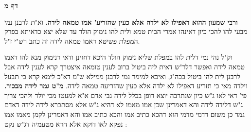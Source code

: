 \documentclass[12pt, openany]{book}
\newcommand{\sethebfont}{
\fontsize{10.5pt}{21.0pt} \selectfont
}
\newcommand{\twocol}[1]{
	{\sethebfont \begin{multicols}{2}
			#1
	\end{multicols}}	
}
\newcommand{\sectname}{}
\newcommand{\newsection}[1]{
	\addcontentsline{toc}{section}{#1}
	\renewcommand{\sectname}{#1}	
	\vspace{-\baselineskip}
	\begin{center}
		\textbf{%
\fontsize{16pt}{16pt}\selectfont
			#1}
	\end{center}
	\vspace{-\baselineskip}
	\nopagebreak
}
\begin{document}
\newsection{דף מ}
\twocol{
\textbf{ורבי שמעון ההוא דאפילו לא ילדה אלא כעין שהזריע' אמו טמאה לידה.}  וא"ת לרבנן נמי מבעי להו להכי כיון דאינהו אמרי הבית טמא ולית להו נימוק הולד עד שלא יצא כדאיתא בפרק המפלת פשיטא דאמו טמאה לידה זה כתב רש"י ז"ל.\par  וק"ל נהי נמי דלית להו במפלת שליא נימוק הולד היכא דחזינן ודאי דנימוק מנא להו דאמו טמאה לידה ואפשר דלר"ש דאית ליה ביטול ברוב לענין טומאה איצטרך קרא לענין לידה אבל לרבנן לית להו ביטול בכה"ג, ואיכא למימר נמי לרבנן ממילא ש"מ דא"כ לימא קרא כי תבעל וילדה מאי כי תזריע דאפילו לא ילדה אלא כעין שהזריעה טמאה לידה. 
\textbf{מ"ט גמר לידה מבכור.}  פי' דאי לאו ג"ש כיון שנתרבה יוצא דופן בכלל לידה גבי אדם א"א למעטו מכי יולד ולהכי צריך ג"ש דלידה לידה והא דאמרינן שכן אמו מאמו לא דהיא ג"ש אלא מסתברא לידה לידה דאדם גמר כן משום דדמי מדמי הוא דהכא כתיב אמו והכא כתיב אמו והא דאמרינן לקמן מאמו אמו נפקא לאו דוקא אלא חדא מטעמיה דג"ש נקט : 
}
\end{document}
